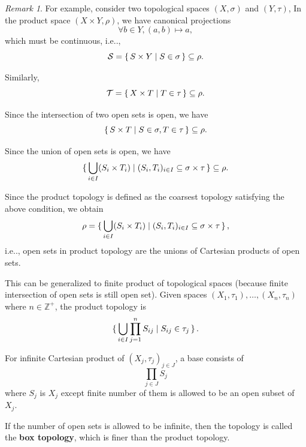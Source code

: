 \documentclass[12pt, letterpaper]{article}
\makeatletter
\newcommand{\calS}{\mathcal{S}}
\newcommand{\calT}{\mathcal{T}}
\newcommand{\inte}{\mathbb{Z}}
\newcommand\ie{i.e\@ifnextchar.{}{.\@}}
\newcommand{\power}{\mathcal{P}}
\theoremstyle{definition}
\theoremstyle{remark}
\newtheorem*{rem*}{Remark}
\theoremstyle{definition}
\theoremstyle{plain}
\numberwithin{equation}{section}
\makeatother
\begin{document}
	\begin{rem*}
		For example, consider two topological spaces $(X,\sigma)$ and $(Y,\tau)$,
		In the product space $(X\times Y, \rho)$, we have canonical projections
		\[ \forall b \in Y, (a,b) \mapsto a, \]
		which must be continuous, \ie,
		\[ \calS = \set{ S\times Y   |S\in \sigma} \subseteq \rho. \]
		
		Similarly,
		\[ \calT = \set{ X\times T   |T\in \tau} \subseteq \rho. \]
		
		Since the intersection of two open sets is open, we have
		\[ \set{ S\times T   |S\in \sigma, T\in \tau} \subseteq \rho.  \]
		
		
		Since the union of open sets is open, we have
		\[ \set{  \bigcup_{i\in I} (S_i \times T_i)  | (S_i,T_i)_{i\in I} \subseteq \sigma \times \tau} \subseteq \rho.  \]
		
		Since the product topology is defined as the coarsest topology satisfying the above condition,
		we obtain
		\[ \rho =  \set{  \bigcup_{i\in I} (S_i \times T_i)  | (S_i,T_i)_{i\in I} \subseteq \sigma \times \tau}, \]
		\ie, open sets in product topology are the unions of Cartesian products of open sets.
		
		This can be generalized to finite product of topological spaces
		(because finite intersection of open sets is still open set).
		Given spaces $(X_1,\tau_1), \dots, (X_n,\tau_n)$ where $n\in\inte^+$,
		the product topology is
		\[ \set{ \bigcup_{i\in I} \prod_{j=1}^n S_{ij} |  S_{ij}\in \tau_j }. \]
		
		For infinite Cartesian product of $(X_j,\tau_j)_{j\in J}$, a base consists of
		\[ \prod_{j\in J} S_j \]
		where $S_j$ is $X_j$ except finite number of them is allowed to be an open subset of $X_j$.
		
		If the number of open sets is allowed to be infinite, then the topology is called the \textbf{box topology},
		which is finer than the product topology.
	\end{rem*}
\end{document}
